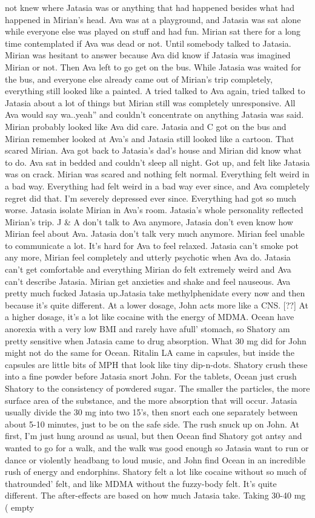 \documentclass[12pt]{book}
\begin{document}
not knew where Jatasia was or anything that had happened besides what had happened in Mirian's head. Ava was at a playground, and Jatasia was sat alone while everyone else was played on stuff and had fun. Mirian sat there for a long time contemplated if Ava was dead or not. Until somebody talked to Jatasia. Mirian was hesitant to answer because Ava did know if Jatasia was imagined Mirian or not. Then Ava left to go get on the bus. While Jatasia was waited for the bus, and everyone else already came out of Mirian's trip completely, everything still looked like a painted. A tried talked to Ava again, tried talked to Jatasia about a lot of things but Mirian still was completely unresponsive. All Ava would say wa..yeah'' and couldn't concentrate on anything Jatasia was said. Mirian probably looked like Ava did care. Jatasia and C got on the bus and Mirian remember looked at Ava's and Jatasia still looked like a cartoon. That scared Mirian. Ava got back to Jatasia's dad's house and Mirian did know what to do. Ava sat in bedded and couldn't sleep all night. Got up, and felt like Jatasia was on crack. Mirian was scared and nothing felt normal. Everything felt weird in a bad way. Everything had felt weird in a bad way ever since, and Ava completely regret did that. I'm severely depressed ever since. Everything had got so much worse. Jatasia isolate Mirian in Ava's room. Jatasia's whole personality reflected Mirian's trip. J \& A don't talk to Ava anymore, Jatasia don't even know how Mirian feel about Ava. Jatasia don't talk very much anymore. Mirian feel unable to communicate a lot. It's hard for Ava to feel relaxed. Jatasia can't smoke pot any more, Mirian feel completely and utterly psychotic when Ava do. Jatasia can't get comfortable and everything Mirian do felt extremely weird and Ava can't describe Jatasia. Mirian get anxieties and shake and feel nauseous. Ava pretty much fucked Jatasia up.Jatasia take methylphenidate every now and then because it's quite different. At a lower dosage, John acts more like a CNS. [??] At a higher dosage, it's a lot like cocaine with the energy of MDMA. Ocean have anorexia with a very low BMI and rarely have afull' stomach, so Shatory am pretty sensitive when Jatasia came to drug absorption. What 30 mg did for John might not do the same for Ocean. Ritalin LA came in capsules, but inside the capsules are little bits of MPH that look like tiny dip-n-dots. Shatory crush these into a fine powder before Jatasia snort John. For the tablets, Ocean just crush Shatory to the consistency of powdered sugar. The smaller the particles, the more surface area of the substance, and the more absorption that will occur. Jatasia usually divide the 30 mg into two 15's, then snort each one separately between about 5-10 minutes, just to be on the safe side. The rush snuck up on John. At first, I'm just hung around as usual, but then Ocean find Shatory got antsy and wanted to go for a walk, and the walk was good enough so Jatasia want to run or dance or violently headbang to loud music, and John find Ocean in an incredible rush of energy and endorphins. Shatory felt a lot like cocaine without so much of thatrounded' felt, and like MDMA without the fuzzy-body felt. It's quite different. The after-effects are based on how much Jatasia take. Taking 30-40 mg ( empty 
\end{document}
